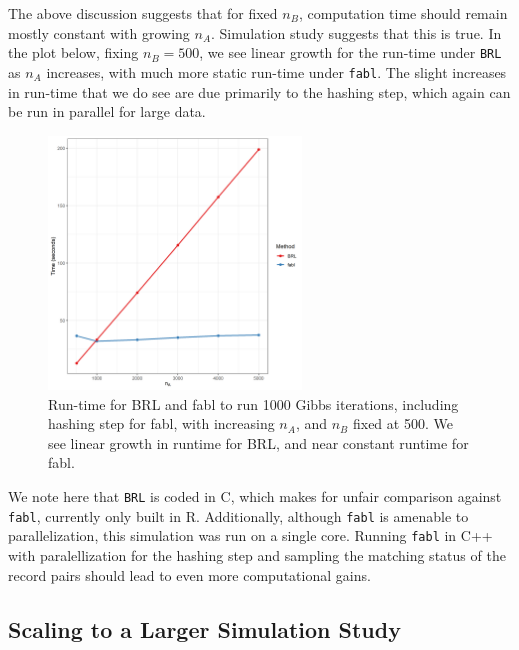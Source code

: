 \documentclass[12pt,letterpaper]{article}
\newcommand{\1}[1]{\mathbb{I}\!\left[#1\right]} %
\begin{document}
The above discussion suggests that for fixed \(n_B\), computation time
should remain mostly constant with growing \(n_A\). Simulation study
suggests that this is true. In the plot below, fixing \(n_B = 500\), we
see linear growth for the run-time under \texttt{BRL} as \(n_A\)
increases, with much more static run-time under \texttt{fabl}. The
slight increases in run-time that we do see are due primarily to the
hashing step, which again can be run in parallel for large data.

\begin{figure}[h!]
	
	{\centering \includegraphics[width=0.6\textwidth]{../notes/figures/speed_plot_fixed_nB} 
		
	}
	
	\caption{Run-time for BRL and fabl to run 1000 Gibbs iterations, including hashing step for fabl, with increasing $n_A$, and $n_B$ fixed at 500. We see linear growth in runtime for BRL, and near constant runtime for fabl.}\label{fig:speed2}
\end{figure}

We note here that \texttt{BRL} is coded in C, which makes for unfair
comparison against \texttt{fabl}, currently only built in R.
Additionally, although \texttt{fabl} is amenable to parallelization,
this simulation was run on a single core. Running \texttt{fabl} in C++
with paralellization for the hashing step and sampling the matching
status of the record pairs should lead to even more computational gains.

\hypertarget{scale}{%
	\subsection{Scaling to a Larger Simulation Study}\label{scale}}
\end{document}
